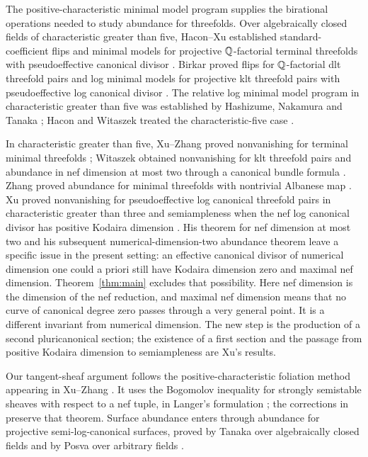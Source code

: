 The positive-characteristic minimal model program supplies the
birational operations needed to study abundance for threefolds.
Over algebraically closed fields of characteristic greater than five,
Hacon--Xu established standard-coefficient flips and minimal models
for projective $\mathbb Q$-factorial terminal threefolds with pseudoeffective
canonical divisor \cite[Theorems~1.1 and~1.2]{haconxu2015}.
Birkar proved flips for $\mathbb Q$-factorial dlt threefold pairs and log
minimal models for projective klt threefold pairs with pseudoeffective
log canonical divisor \cite[Theorems~1.1 and~1.2]{birkar2016}.
The relative log minimal model program in characteristic greater than
five was established by Hashizume, Nakamura and Tanaka
\cite{hnt2020}; Hacon and Witaszek treated the characteristic-five
case \cite{hw2022}.

In characteristic greater than five,
Xu--Zhang proved nonvanishing for terminal minimal threefolds
\cite{xuzhang2019}; Witaszek obtained nonvanishing for klt threefold
pairs and abundance in nef dimension at most two through a canonical
bundle formula \cite{witaszek2021}.  Zhang proved abundance for
minimal threefolds with nontrivial Albanese map \cite{zhang2020}.
Xu proved nonvanishing for pseudoeffective log
canonical threefold pairs in characteristic greater than three and
semiampleness when the nef log canonical divisor has positive Kodaira
dimension \cite[Theorems~1.4 and~1.6]{xu2024}.  His theorem for nef
dimension at most two \cite[Theorem~1.8]{xu2024} and his subsequent
numerical-dimension-two abundance theorem \cite[Theorem~1.1]{xu2026}
leave a specific issue in the present setting: an effective canonical
divisor of numerical dimension one could a priori still have Kodaira
dimension zero and maximal nef dimension.  Theorem~\ref{thm:main}
excludes that possibility.  Here nef dimension is the dimension of the
nef reduction, and maximal nef dimension means that no curve of
canonical degree zero passes through a very general point.  It is a
different invariant from numerical dimension.  The new step is the
production of a second pluricanonical section; the existence of a first
section and the passage from positive Kodaira dimension to semiampleness
are Xu's results.

Our tangent-sheaf argument follows the positive-characteristic
foliation method appearing in Xu--Zhang \cite[Section~2]{xuzhang2019}.
It uses the Bogomolov inequality for strongly semistable sheaves with
respect to a nef tuple, in Langer's formulation
\cite[Theorem~3.2]{langer2004}; the corrections in
\cite{langeradd2004} preserve that theorem.  Surface abundance enters
through abundance for projective semi-log-canonical surfaces, proved
by Tanaka over algebraically closed fields \cite[Theorem~0.1]{tanaka2016}
and by Posva over arbitrary fields \cite[Theorem~3.1]{posva2024}.

